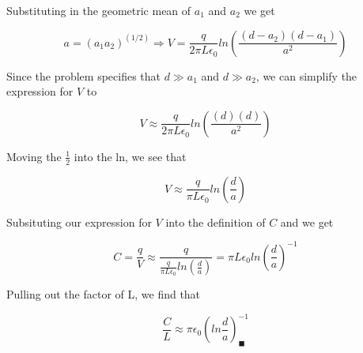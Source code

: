 Substituting in the geometric mean of $a_1$ and $a_2$ we get

\begin{equation}
  a = (a_1a_2)^{(1/2)}
  \Rightarrow V = \frac{q}{2 \pi L \epsilon_0} ln\left( \frac{(d-a_2)(d-a_1)}{a^2} \right)
\end{equation}

Since the problem specifies that $d \gg a_1$ and $d \gg a_2$, we can
simplify the expression for $V$ to

\begin{equation}
  V \approx \frac{q}{2 \pi L \epsilon_0} ln\left( \frac{(d)(d)}{a^2} \right)
\end{equation}

Moving the $\frac 1 2$ into the ln, we see that

\begin{equation}
  V \approx \frac{q}{\pi L \epsilon_0} ln\left( \frac{d}{a} \right)
\end{equation}

Subsituting our expression for $V$ into the definition of $C$ and we get

\begin{equation}
  C = \frac q V
  \approx \frac{q}{\frac{q}{\pi L \epsilon_0} ln\left( \frac d a \right)}
  = \pi L \epsilon_0 ln\left( \frac d a \right)^{-1}
\end{equation}

Pulling out the factor of L, we find that

\begin{equation}
  \frac C L
  \approx \pi \epsilon_0 \left( ln \frac d a \right)^{-1}_\blacksquare
\end{equation}




